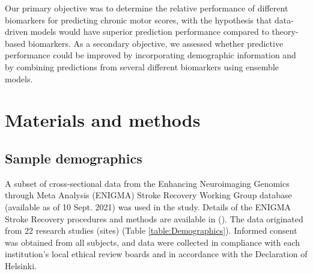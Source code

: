 \documentclass[10pt]{article}
\begin{document}
Our primary objective was to determine the relative performance of different biomarkers for predicting chronic motor scores, with the hypothesis that data-driven models would have superior prediction performance compared to theory-based biomarkers. As a secondary objective, we assessed whether predictive performance could be improved by incorporating demographic information and by combining predictions from several different biomarkers using ensemble models.

\section{Materials and methods}
\subsection{Sample demographics}
A subset of cross‐sectional data from the Enhancing Neuroimaging Genomics through Meta Analysis (ENIGMA) Stroke Recovery Working Group database (available as of 10 Sept. 2021) was used in the study. Details of the ENIGMA Stroke Recovery procedures and methods are available in (\cite{Liew2020-ps}). The data originated from 22 research studies (sites) (Table \ref{table:Demographics}). Informed consent was obtained from all subjects, and data were collected in compliance with each institution’s local ethical review boards and in accordance with the Declaration of Helsinki.
\end{document}
